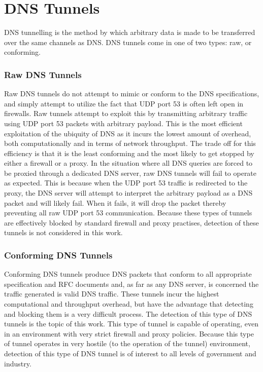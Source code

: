 \documentclass[12pt]{report}
\theoremstyle{remark}
\theoremstyle{definition}
\theoremstyle{definition}
\theoremstyle{definition}
\begin{document}
\section{DNS Tunnels} \label{dnstunnels-types}
DNS tunnelling is the method by which arbitrary data is made to be transferred
over the same channels as DNS. DNS tunnels come in one of two types: raw, or
conforming.

\subsubsection{Raw DNS Tunnels} \label{dnstunnels-types-raw} Raw DNS tunnels do
not attempt to mimic or conform to the DNS specifications, and simply attempt to
utilize the fact that UDP port 53 is often left open in firewalls. Raw tunnels
attempt to exploit this by transmitting arbitrary traffic using UDP port 53
packets with arbitrary payload. This is the most efficient exploitation of the
ubiquity of DNS as it incurs the lowest amount of overhead, both computationally
and in terms of network throughput. The trade off for this efficiency is that it
is the least conforming and the most likely to get stopped by either a firewall
or a proxy. In the situation where all DNS queries are forced to be proxied
through a dedicated DNS server, raw DNS tunnels will fail to operate as
expected. This is because when the UDP port 53 traffic is redirected to the
proxy, the DNS server will attempt to interpret the arbitrary payload as a DNS
packet and will likely fail. When it fails, it will drop the packet thereby
preventing all raw UDP port 53 communication. Because these types of tunnels are
effectively blocked by standard firewall and proxy practises, detection of these
tunnels is not considered in this work.

\subsubsection{Conforming DNS Tunnels} \label{dnstunnels-types-conforming}
Conforming DNS tunnels produce DNS packets that conform to all appropriate
specification and RFC documents and, as far as any DNS server, is concerned the
traffic generated is valid DNS traffic. These tunnels incur the highest
computational and throughput overhead, but have the advantage that detecting and
blocking them is a very difficult process. The detection of this type of DNS
tunnels is the topic of this work. This type of tunnel is capable of operating,
even in an environment with very strict firewall and proxy policies. Because
this type of tunnel operates in very hostile (to the operation of the tunnel)
environment, detection of this type of DNS tunnel is of interest to all levels
of government and industry.
\end{document}
